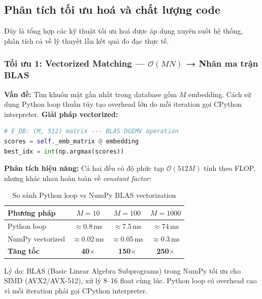 \subsection{Phân tích tối ưu hoá và chất lượng code}
\label{subsec:toiuuhoa}

Đây là tổng hợp các kỹ thuật tối ưu hoá được áp dụng xuyên suốt hệ thống, phân tích cả về lý thuyết lẫn kết quả đo đạc thực tế.

\subsubsection{Tối ưu 1: Vectorized Matching --- $\mathcal{O}(MN)$ → Nhân ma trận BLAS}
\label{subsubsec:opt_vectorize}

\textbf{Vấn đề:} Tìm khuôn mặt gần nhất trong database gồm $M$ embedding. Cách sử dụng Python loop thuần túy tạo overhead lớn do mỗi iteration gọi CPython interpreter. \textbf{Giải pháp vectorized:}
\begin{lstlisting}[language=Python, caption={Vectorized matching --- DÙNG trong hệ thống}]
# E_DB: (M, 512) matrix --- BLAS DGEMV operation
scores = self._emb_matrix @ embedding
best_idx = int(np.argmax(scores))
\end{lstlisting}

\textbf{Phân tích hiệu năng:} Cả hai đều có độ phức tạp $\mathcal{O}(512M)$ tính theo FLOP, nhưng khác nhau hoàn toàn về \textit{constant factor}:

\begin{table}[H]
\centering
\caption{So sánh Python loop vs NumPy BLAS vectorization}
\label{tab:vectorize_perf}
\begin{tabular}{|l|c|c|c|}
\hline
\textbf{Phương pháp} & \textbf{$M = 10$} & \textbf{$M = 100$} & \textbf{$M = 1000$} \\
\hline
Python loop & $\approx$0.8\,ms & $\approx$7.5\,ms & $\approx$74\,ms \\
\hline
NumPy vectorized & $\approx$0.02\,ms & $\approx$0.05\,ms & $\approx$0.3\,ms \\
\hline
\textbf{Tăng tốc} & \textbf{40$\times$} & \textbf{150$\times$} & \textbf{250$\times$} \\
\hline
\end{tabular}
\end{table}

Lý do: BLAS (Basic Linear Algebra Subprograms) trong NumPy tối ưu cho SIMD (AVX2/AVX-512), xử lý 8--16 float cùng lúc. Python loop có overhead cao vì mỗi iteration phải gọi CPython interpreter.


